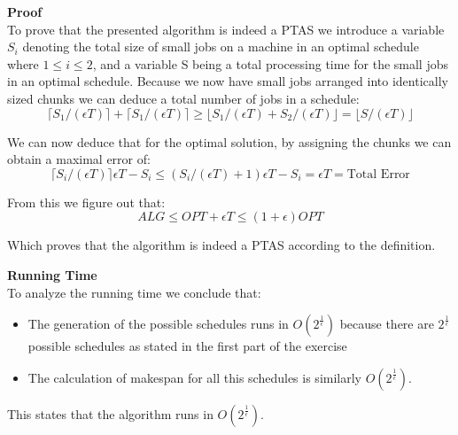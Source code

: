 \textbf{Proof}\\
To prove that the presented algorithm is indeed a PTAS we introduce a variable $ S_i $ denoting the total size of
small jobs on a machine in an optimal schedule where $ 1 \le i \le 2 $, and a variable S being a total processing time for the small jobs in an optimal schedule.
Because we now have small jobs arranged into identically sized chunks we can deduce a total number of jobs in a schedule:
$$ \lceil S_1/(\epsilon T) \rceil + \lceil S_1/(\epsilon T) \rceil \ge \lfloor S_1/(\epsilon T) + S_2/(\epsilon T) \rfloor = \lfloor S/(\epsilon T) \rfloor $$ 

We can now deduce that for the optimal solution, by assigning the chunks we can obtain a maximal error of:
$$ \lceil S_i / ( \epsilon T ) \rceil \epsilon T - S_i \le (S_i / ( \epsilon T ) +1 ) \epsilon T - S_i = \epsilon T = \text{Total Error} $$

From this we figure out that:
$$ ALG \le OPT + \epsilon T \le (1+\epsilon) OPT $$

Which proves that the algorithm is indeed a PTAS according to the definition.

\textbf{Running Time}\\
To analyze the running time we conclude that:
\begin{itemize}
\item The generation of the possible schedules runs in $ O(2^{\frac{1}{\epsilon}}) $ because there are $ 2^{\frac{1}{\epsilon}} $ possible schedules as stated in the first part of the exercise
\item The calculation of makespan for all this schedules is similarly $ O(2^{\frac{1}{\epsilon}}) $.
\end{itemize}

This states that the algorithm runs in $ O(2^{\frac{1}{\epsilon}}) $.



